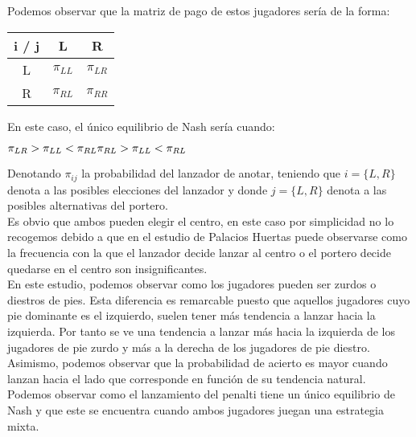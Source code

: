 \documentclass[10pt,a4paper]{book}
\begin{document}
Podemos observar que la matriz de pago de estos jugadores sería de la forma:\\



\begin{center}
	\begin{tabular}{|c|c|c|}
		\hline
		i / j & L & R\\
		\hline
		L & $\pi_{LL}$ & $\pi_{LR}$ \\
		\hline
		R & $\pi_{RL}$ & $\pi_{RR}$ \\
		\hline
	\end{tabular}
\end{center}


En este caso, el único equilibrio de Nash sería cuando:\\

\begin{center}

$ \pi_{LR} > \pi_{LL} < \pi_{RL} \newline
  \pi_{RL} > \pi_{LL} < \pi_{RL}$

\end{center}


Denotando $\pi_{ij}$ la probabilidad del lanzador de anotar, teniendo que $i=\{L,R\}$ denota a las posibles elecciones del lanzador y donde $j=\{L,R\}$ denota a las posibles alternativas del portero.\\

Es obvio que ambos pueden elegir el centro, en este caso por simplicidad no lo recogemos debido a que en el estudio de Palacios Huertas puede observarse como la frecuencia con la que el lanzador decide lanzar al centro o el portero decide quedarse en el centro son insignificantes.\\

En este estudio, podemos observar como los jugadores pueden ser zurdos o diestros de pies. Esta diferencia es remarcable puesto que aquellos jugadores cuyo pie dominante es el izquierdo, suelen tener más tendencia a lanzar hacia la izquierda. Por tanto se ve una tendencia a lanzar más hacia la izquierda de los jugadores de pie zurdo y más a la derecha de los jugadores de pie diestro. Asimismo, podemos observar que la probabilidad de acierto es mayor cuando lanzan hacia el lado que corresponde en función de su tendencia natural.\\

Podemos observar como el lanzamiento del penalti tiene un único equilibrio de Nash y que este se encuentra cuando ambos jugadores juegan una estrategia mixta.\\
\end{document}
